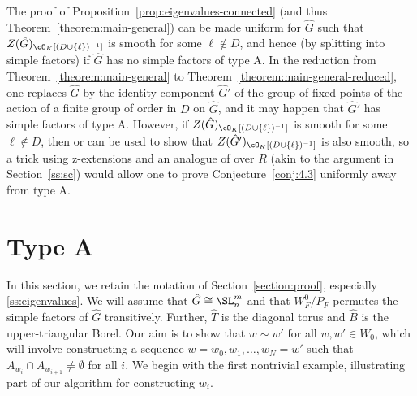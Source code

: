 \begin{remark}
    The proof of Proposition~\ref{prop:eigenvalues-connected} (and thus Theorem~\ref{theorem:main-general}) can be made uniform for $\hat{G}$ such that $Z(\hat{G})_{\cO_K[(D \cup \{\ell\})^{-1}]}$ is smooth for some $\ell \not\in D$, and hence (by splitting into simple factors) if $\hat{G}$ has no simple factors of type A. In the reduction from Theorem~\ref{theorem:main-general} to Theorem~\ref{theorem:main-general-reduced}, one replaces $\hat{G}$ by the identity component $\hat{G}'$ of the group of fixed points of the action of a finite group of order in $D$ on $\hat{G}$, and it may happen that $\hat{G}'$ has simple factors of type A. However, if $Z(\hat{G})_{\cO_K[(D \cup \{\ell\})^{-1}]}$ is smooth for some $\ell \not\in D$, then \cite[3.11]{DHKM} or \cite[3.2, 5.5]{Cotner-Springer} can be used to show that $Z(\hat{G}')_{\cO_K[(D \cup \{\ell\})^{-1}]}$ is also smooth, so a trick using z-extensions and an analogue of \cite[4.27]{DHKM} over $R$ (akin to the argument in Section~\ref{ss:sc}) would allow one to prove Conjecture~\ref{conj:4.3} uniformly away from type A.
\end{remark}





\appendix

\section{Type A}\label{appendix:a}

In this section, we retain the notation of Section~\ref{section:proof}, especially \ref{ss:eigenvalues}. We will assume that $\hat{G} \cong \SL_n^m$ and that $W_F^0/P_F$ permutes the simple factors of $\hat{G}$ transitively. Further, $\hat{T}$ is the diagonal torus and $\hat{B}$ is the upper-triangular Borel. Our aim is to show that $w \sim w'$ for all $w, w' \in W_0$, which will involve constructing a sequence $w = w_0, w_1, \dots, w_N = w'$ such that $A_{w_i} \cap A_{w_{i+1}} \neq \emptyset$ for all $i$. We begin with the first nontrivial example, illustrating part of our algorithm for constructing $w_i$.

